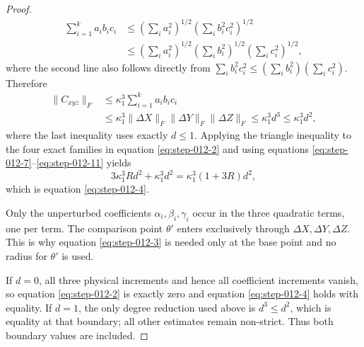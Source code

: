 \begin{proof}
\begin{equation}
\begin{aligned}
  \sum_{i=1}^k a_ib_ic_i
  &\le\left(\sum_i a_i^2\right)^{1/2}
       \left(\sum_i b_i^2c_i^2\right)^{1/2}\\
  &\le\left(\sum_i a_i^2\right)^{1/2}
       \left(\sum_i b_i^2\right)^{1/2}
       \left(\sum_i c_i^2\right)^{1/2},
\end{aligned}\label{eq:step-012-10}
\end{equation}
where the second line also follows directly from
\(\sum_i b_i^2c_i^2\le(\sum_i b_i^2)(\sum_i c_i^2)\).
Therefore
\begin{equation}
\begin{aligned}
  \|C_{xyz}\|_F
  &\le\kappa_1^3\sum_{i=1}^k a_ib_ic_i\\
  &\le\kappa_1^3
       \|\Delta X\|_F\|\Delta Y\|_F\|\Delta Z\|_F
   \le\kappa_1^3d^3
   \le\kappa_1^3d^2,
\end{aligned}\label{eq:step-012-11}
\end{equation}
where the last inequality uses exactly \(d\le1\). Applying the triangle
inequality to the four exact families in equation \eqref{eq:step-012-2} and using
equations \eqref{eq:step-012-7}--\eqref{eq:step-012-11} yields
\[
  3\kappa_1^3Rd^2+\kappa_1^3d^2
  =\kappa_1^3(1+3R)d^2,
\]
which is equation \eqref{eq:step-012-4}.

Only the unperturbed coefficients \(\alpha_i,\beta_i,\gamma_i\) occur in
the three quadratic terms, one per term. The comparison point
\(\theta'\) enters exclusively through \(\Delta X,\Delta Y,\Delta Z\).
This is why equation \eqref{eq:step-012-3} is needed only at the base point and no radius for
\(\theta'\) is used.

If \(d=0\), all three physical increments and hence all coefficient
increments vanish, so equation \eqref{eq:step-012-2} is exactly zero and equation \eqref{eq:step-012-4} holds
with equality. If \(d=1\), the only degree reduction used above is
\(d^3\le d^2\), which is equality at that boundary; all other estimates
remain non-strict. Thus both boundary values are included. 

\end{proof}


